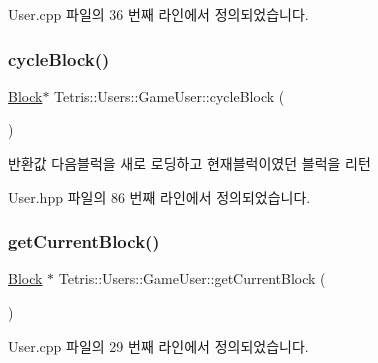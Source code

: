 User.\+cpp 파일의 36 번째 라인에서 정의되었습니다.

\mbox{\label{class_tetris_1_1_users_1_1_game_user_a6011fe9738235fa93fac51db4fafdbd7}} 
\subsubsection{\texorpdfstring{cycle\+Block()}{cycleBlock()}\hspace{0.1cm}{\footnotesize\ttfamily [2/2]}}
{\footnotesize\ttfamily \hyperlink{class_tetris_1_1_block}{Block}$\ast$ Tetris\+::\+Users\+::\+Game\+User\+::cycle\+Block (\begin{DoxyParamCaption}{ }\end{DoxyParamCaption})\hspace{0.3cm}{\ttfamily [inline]}}

\begin{DoxyReturn}{반환값}
다음블럭을 새로 로딩하고 현재블럭이였던 블럭을 리턴 
\end{DoxyReturn}


User.\+hpp 파일의 86 번째 라인에서 정의되었습니다.

\mbox{\label{class_tetris_1_1_users_1_1_game_user_a3d4bcc74d518c28356012f8a42b85896}} 
\subsubsection{\texorpdfstring{get\+Current\+Block()}{getCurrentBlock()}\hspace{0.1cm}{\footnotesize\ttfamily [1/2]}}
{\footnotesize\ttfamily \hyperlink{class_tetris_1_1_block}{Block} $\ast$ Tetris\+::\+Users\+::\+Game\+User\+::get\+Current\+Block (\begin{DoxyParamCaption}{ }\end{DoxyParamCaption})}



User.\+cpp 파일의 29 번째 라인에서 정의되었습니다.

